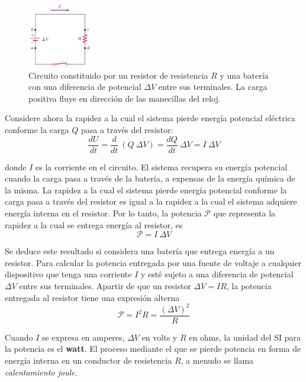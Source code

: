     \begin{figure}[H]
    \centering
      \includegraphics[width=0.25\textwidth]{4/figure_9}
      \caption{Circuito constituido por un resistor de resistencia $R$ y una batería con una diferencia de potencial
      $\Delta V$ entre sus terminales. La carga positiva fluye en dirección de las manecillas del reloj.}
    \end{figure}

    \PN Considere ahora la rapidez a la cual el sistema pierde energía potencial eléctrica conforme la carga $Q$ pasa a
    través del resistor:
    \begin{equation*}
      \frac{dU}{dt} = \frac{d}{dt} \ (Q \ \Delta V) = \frac{dQ}{dt} \ \Delta V = I \ \Delta V
    \end{equation*}

    \PN donde $I$ es la corriente en el circuito. El sistema recupera su energía potencial cuando la carga pasa a través
    de la batería, a expensas de la energía química de la misma. La rapidez a la cual el sistema pierde energía
    potencial conforme la carga pasa a través del resistor es igual a la rapidez a la cual el sistema adquiere energía
    interna en el resistor. Por lo tanto, la potencia $\mathcal{P}$ que representa la rapidez a la cual se entrega
    energía al resistor, es
    \begin{equation*}
      \mathcal{P} = I \ \Delta V
    \end{equation*}

    \PN Se deduce este resultado si considera una batería que entrega energía a un resistor. Para calcular la potencia
    entregada por una fuente de voltaje a cualquier dispositivo que tenga una corriente $I$ y esté sujeto a una
    diferencia de potencial $\Delta V$ entre sus terminales. Apartir de que un resistor $\Delta V = IR$, la potencia
    entregada al resistor tiene una expresión alterna
    \begin{equation*}
      \mathcal{P} = I^{2} R = \frac{(\Delta V)^{2}}{R}
    \end{equation*}

    \PN Cuando $I$ se expresa en amperes, $\Delta V$ en volts y $R$ en ohms, la unidad del SI para la potencia es el
    \textbf{watt}. El proceso mediante el que se pierde potencia en forma de energía interna en un conductor de
    resistencia $R$, a menudo se llama \textit{calentamiento joule}.
